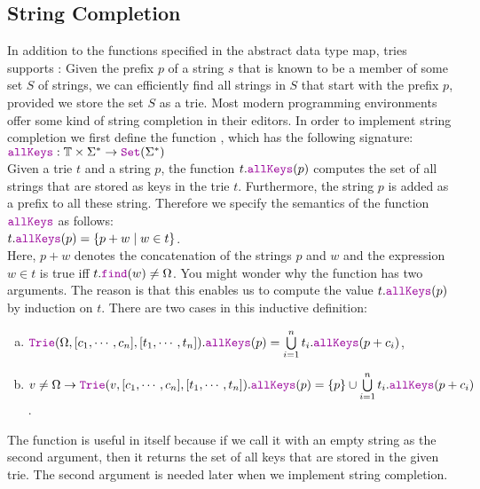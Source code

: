 \subsection{String Completion}
In addition to the functions specified in the abstract data type map, tries supports 
:  Given the prefix $p$ of a string $s$ that is known to be a
member of some set $S$ of strings, we can efficiently find all strings in $S$ that start with the prefix $p$, provided we
store the set $S$ as a trie.  Most modern programming environments offer some kind of string completion in
their editors.  In order to implement string completion we first define the function , which
has the following signature:
\\[0.2cm]
\hspace*{1.3cm}
$\mytt{allKeys}: \mathbb{T} \times \Sigma^* \rightarrow \mytt{Set}(\Sigma^*)$
\\[0.2cm]
Given a trie $t$ and a string $p$, the function $t.\mytt{allKeys}(p)$ computes the set of all strings that
are stored as keys in the trie $t$.  Furthermore, the string $p$ is added as a prefix to all these string.
Therefore we specify the semantics of the function $\mytt{allKeys}$ as follows:
\\[0.2cm]
\hspace*{1.3cm}
$t.\mytt{allKeys}(p) = \{ p+w \mid w \in t \}$.
\\[0.2cm]
Here, $p+w$ denotes the concatenation of the strings $p$ and $w$ and the expression $w \in t$ is true iff
$t.\mytt{find}(w) \not= \Omega$.  You might wonder why the function  has two arguments.  The
reason is that this enables us to compute the value $t.\mytt{allKeys}(p)$ by induction on $t$.  There are two
cases in this inductive definition:  
\begin{enumerate}[(a)]
\item $\mytt{Trie}(\Omega, [c_1, \cdots, c_n], [t_1,\cdots,t_n]).\mytt{allKeys}(p) = 
       \bigcup\limits_{i=1}^n t_i.\mytt{allKeys}(p+c_i) 
      $,
\item $v \not= \Omega \rightarrow 
       \mytt{Trie}(v, [c_1, \cdots, c_n], [t_1,\cdots,t_n]).\mytt{allKeys}(p) = 
       \{p\} \cup \bigcup\limits_{i=1}^n t_i.\mytt{allKeys}(p+c_i) 
      $.
\end{enumerate}
The function  is useful in itself because if we call it with an empty string as the second
argument, then it returns the set of all keys that are stored in the given trie.  The second argument is needed
later when we implement string completion. 

